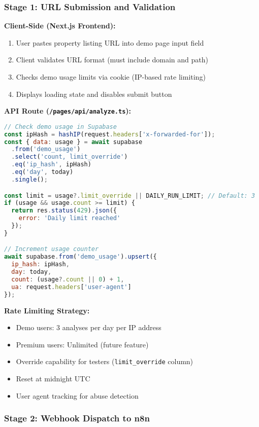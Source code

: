 \documentclass[11pt,a4paper]{article}
\begin{document}
\subsubsection{Stage 1: URL Submission and Validation}

\textbf{Client-Side (Next.js Frontend):}
\begin{enumerate}
  \item User pastes property listing URL into demo page input field
  \item Client validates URL format (must include domain and path)
  \item Checks demo usage limits via cookie (IP-based rate limiting)
  \item Displays loading state and disables submit button
\end{enumerate}

\textbf{API Route (\texttt{/pages/api/analyze.ts}):}
\begin{lstlisting}[language=JavaScript, caption=Rate Limiting Logic]
// Check demo usage in Supabase
const ipHash = hashIP(request.headers['x-forwarded-for']);
const { data: usage } = await supabase
  .from('demo_usage')
  .select('count, limit_override')
  .eq('ip_hash', ipHash)
  .eq('day', today)
  .single();

const limit = usage?.limit_override || DAILY_RUN_LIMIT; // Default: 3
if (usage && usage.count >= limit) {
  return res.status(429).json({
    error: 'Daily limit reached'
  });
}

// Increment usage counter
await supabase.from('demo_usage').upsert({
  ip_hash: ipHash,
  day: today,
  count: (usage?.count || 0) + 1,
  ua: request.headers['user-agent']
});
\end{lstlisting}

\textbf{Rate Limiting Strategy:}
\begin{itemize}
  \item Demo users: 3 analyses per day per IP address
  \item Premium users: Unlimited (future feature)
  \item Override capability for testers (\texttt{limit\_override} column)
  \item Reset at midnight UTC
  \item User agent tracking for abuse detection
\end{itemize}

\subsubsection{Stage 2: Webhook Dispatch to n8n}
\end{document}
